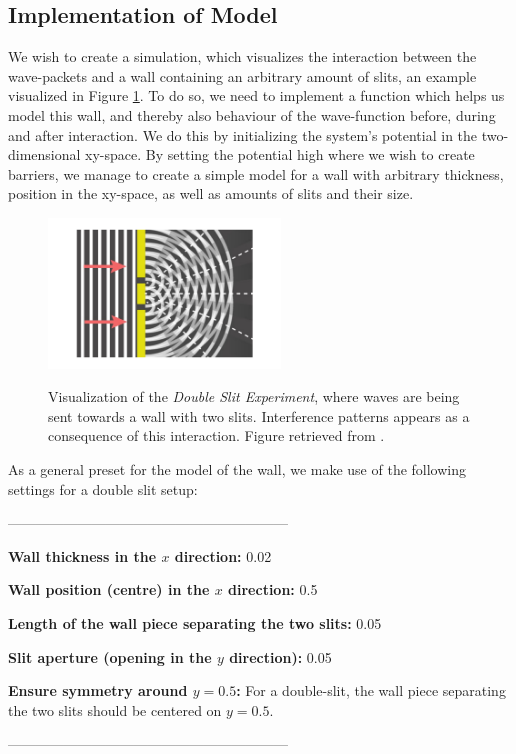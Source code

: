 \documentclass[10pt, nofootinbib, twocolumn]{revtex4-1}
\begin{document}
\subsection{Implementation of Model}\label{sec:implementation}
We wish to create a simulation, which visualizes the interaction between the wave-packets and a wall containing an arbitrary amount of slits, an example visualized in Figure \ref{fig:example}. To do so, we need to implement a function which helps us model this wall, and thereby also behaviour of the wave-function before, during and after interaction. We do this by initializing the system's potential in the two-dimensional xy-space. By setting the potential high where we wish to create barriers, we manage to create a simple model for a wall with arbitrary thickness, position in the xy-space, as well as amounts of slits and their size. \\

\begin{figure}[H]
    \caption{Visualization of the \textit{Double Slit Experiment}, where waves are being sent towards a wall with two slits. Interference patterns appears as a consequence of this interaction. Figure retrieved from \cite[p.~426]{oscillations}.}
    \centering
    \includegraphics[width = 0.55\textwidth]{figures/interference.pdf} 
    \label{fig:example}
\end{figure} 


\newpage
As a general preset for the model of the wall, we make use of the following settings for a double slit setup:
\begin{center} ------------------------------------------------------------ \end{center}
\begin{description}[]
    \item \textbf{Wall thickness in the $x$ direction:} 0.02
    \item \textbf{Wall position (centre) in the $x$ direction:} 0.5
    \item \textbf{Length of the wall piece separating the two slits:} 0.05
    \item \textbf{Slit aperture (opening in the $y$ direction):} 0.05 
    \item \textbf{Ensure symmetry around $y = 0.5$:} For a double-slit, the wall piece separating the two slits should be centered on $y = 0.5$.
\end{description}
\begin{center} ------------------------------------------------------------ \end{center}
\end{document}
